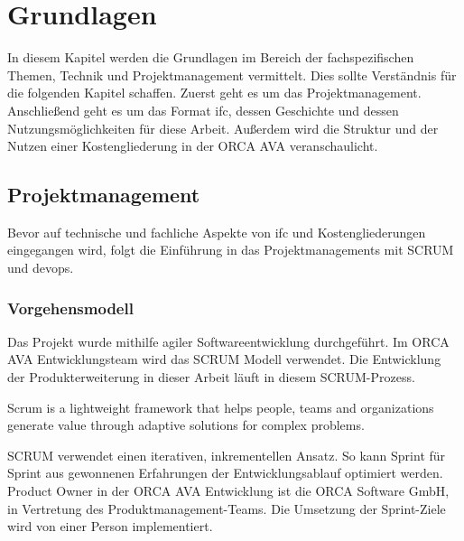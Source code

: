 \chapter{Grundlagen}
\label{c:basics}
In diesem Kapitel werden die Grundlagen im Bereich der fachspezifischen Themen, Technik und Projektmanagement vermittelt. Dies sollte Verständnis für die folgenden Kapitel schaffen. Zuerst geht es um das Projektmanagement. Anschließend geht es um das Format \ac{ifc}, dessen Geschichte und dessen Nutzungsmöglichkeiten für diese Arbeit. Außerdem wird die Struktur und der Nutzen einer Kostengliederung in der ORCA AVA veranschaulicht.

\section{Projektmanagement}
\label{c:basics:project-management}
Bevor auf technische und fachliche Aspekte von \ac{ifc} und Kostengliederungen eingegangen wird, folgt die Einführung in das Projektmanagements mit SCRUM und \ac{devops}.

\subsection{Vorgehensmodell}
\label{c:basics:project-management:procedure_model}
Das Projekt wurde mithilfe agiler Softwareentwicklung durchgeführt. Im ORCA AVA Entwicklungsteam wird das SCRUM Modell verwendet. Die Entwicklung der Produkterweiterung in dieser Arbeit läuft in diesem SCRUM-Prozess.

\begin{definition}[Scrum]
	\glqq Scrum is a lightweight framework that helps people, teams and organizations generate value through adaptive solutions for complex problems. \grqq{} \citep[p.~3]{scrum_2020}
\end{definition}

SCRUM verwendet einen iterativen, inkrementellen Ansatz. So kann Sprint für Sprint aus gewonnenen Erfahrungen der Entwicklungsablauf optimiert werden. \citep{scrum_2020} Product Owner in der ORCA AVA Entwicklung ist die \glqq ORCA Software GmbH\grqq{}, in Vertretung des Produktmanagement-Teams. Die Umsetzung der Sprint-Ziele wird von einer Person implementiert.


